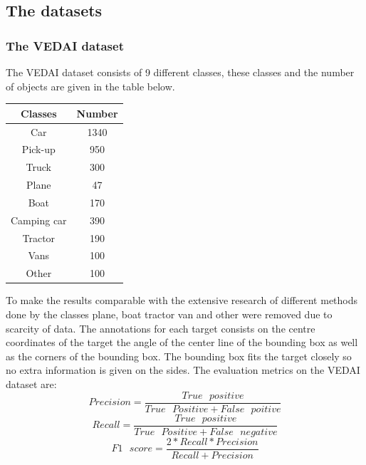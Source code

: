 \documentclass[a4paper,11pt]{article}
\begin{document}
\subsection{The datasets}
\subsubsection{The VEDAI dataset}
The VEDAI dataset \cite{razakarivony_vehicle_2015} consists of 9 different classes, these classes and the number of objects are given in the table below.\begin{center}
\begin{tabular}{|c|c|}
\hline
\textbf{Classes} & \textbf{Number}\\
\hline
Car & 1340\\
Pick-up & 950\\
Truck & 300\\
Plane & 47\\
Boat & 170\\
Camping car & 390\\
Tractor & 190\\
Vans & 100\\
Other & 100\\
\hline
\end{tabular}
\end{center}
To make the results comparable with the extensive research of different methods done by \cite{zhong_robust_2017} the classes plane, boat tractor van and other were removed due to scarcity of data. The annotations for each target consists on the centre coordinates of the target the angle of the center line of the bounding box as well as the corners of the bounding box. The bounding box fits the target closely so no extra information is given on the sides. The evaluation metrics on the VEDAI dataset are:\\
\begin{equation}\label{eq:precision}
Precision=\frac{True\textit{ }positive}{True\textit{ }Positive+False\textit{ }poitive}
\end{equation}
\begin{equation}\label{eq:recall}
Recall=\frac{True\textit{ }positive}{True\textit{ }Positive+False\textit{ }negative}
\end{equation}
\begin{equation}\label{eq:f1}
F1\textit{ }score=\frac{2*Recall*Precision}{Recall+Precision}
\end{equation}
\end{document}
